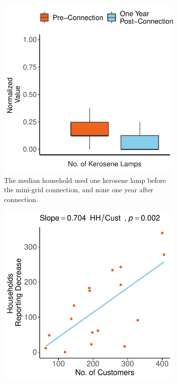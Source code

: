 \begin{figure}[th]
    \centering
    \begin{subfigure}[t]{0.48\textwidth}
        \centering
        \includegraphics[width=\textwidth]{images/health_paired_results.pdf}
        \caption{The median household used one kerosene lamp before the mini-grid connection, and none one year after connection.}
        \label{fig:paired-kerosene}
    \end{subfigure}
    \hfill
    \begin{subfigure}[t]{0.48\textwidth}
        \centering
        \includegraphics[width=\textwidth]{images/kerosene_lamp_usage_change_regression_community.pdf}

\end{subfigure}
\end{figure}

